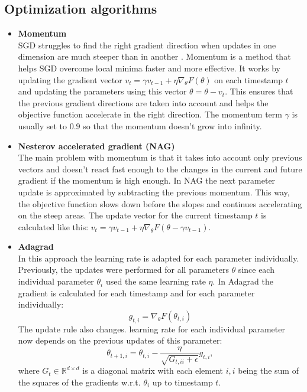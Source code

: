 \subsection{Optimization algorithms}
\begin{itemize}
  \item \textbf{Momentum} \\
    SGD struggles to find the right gradient direction when updates in one dimension are much steeper than in another \autocite{sutton1986two}. Momentum is a method that helps SGD overcome local minima faster and more effective. It works by updating the gradient vector $ v_t = \gamma v_{t-1} + \eta \nabla_\theta F(\theta) $ on each timestamp $t$ and updating the parameters using this vector $ \theta = \theta - v_t $. This ensures that the previous gradient directions are taken into account and helps the objective function accelerate in the right direction. The momentum term $\gamma$ is usually set to $0.9$ so that the momentum doesn't grow into infinity.
  \item \textbf{Nesterov accelerated gradient (NAG)} \autocite{nesterov1983method} \\
    The main problem with momentum is that it takes into account only previous vectors and doesn't react fast enough to the changes in the current and future gradient if the momentum is high enough. In NAG the next parameter update is approximated by subtracting the previous momentum. This way, the objective function slows down before the slopes and continues accelerating on the steep areas. The update vector for the current timestamp $t$ is calculated like this: $ v_t = \gamma v_{t-1} + \eta \nabla_\theta F(\theta - \gamma v_{t-1}) $.
  \item \textbf{Adagrad} \autocite{duchi2011adaptive} \\
    In this approach the learning rate is adapted for each parameter individually. Previously, the updates were performed for all parameters $\theta$ since each individual parameter $\theta_i$ used the same learning rate $\eta$. In Adagrad the gradient is calculated for each timestamp and for each parameter individually:
    \[ g_{t,i} = \nabla_\theta F(\theta_{t,i}) \]
    The update rule also changes. learning rate for each individual parameter now depends on the previous updates of this parameter:
    \[ \theta_{t+1, i} = \theta_{t, i} - \frac{\eta}{\sqrt{G_{t, ii} + \epsilon}} g_{t,i}, \]
    where $ G_t \in \mathbb{R}^{d \times d} $ is a diagonal matrix with each element $i, i$ being the sum of the squares of the gradients w.r.t. $ \theta_i $ up to timestamp $t$.

\end{itemize}
